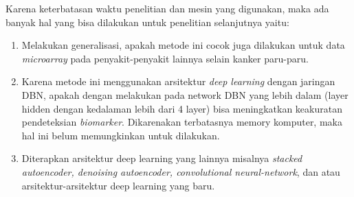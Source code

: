 Karena keterbatasan waktu penelitian dan mesin yang digunakan, maka ada banyak hal yang bisa dilakukan untuk penelitian selanjutnya yaitu: 
\begin{enumerate}
\item Melakukan generalisasi, apakah metode ini cocok juga dilakukan untuk data \textit{microarray} pada penyakit-penyakit lainnya selain kanker paru-paru.
\item Karena metode ini menggunakan arsitektur \textit{deep learning} dengan jaringan DBN, apakah dengan melakukan pada network DBN yang lebih dalam (layer hidden dengan kedalaman lebih dari 4 layer) bisa meningkatkan keakuratan pendeteksian \textit{biomarker}. Dikarenakan terbatasnya memory komputer, maka hal ini belum memungkinkan untuk dilakukan.
\item Diterapkan arsitektur deep learning yang lainnya misalnya \textit{stacked autoencoder, denoising autoencoder, convolutional neural-network}, dan atau arsitektur-arsitektur deep learning yang baru.
\end{enumerate}

